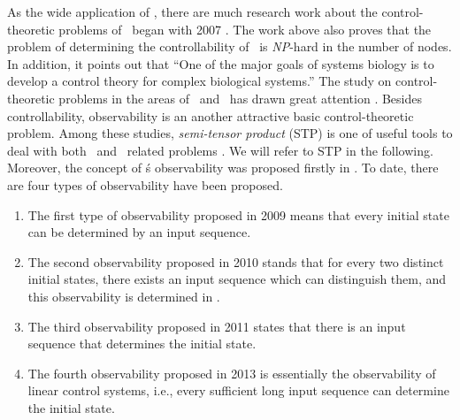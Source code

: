 As the wide application of \BCNs, there are much research work about the control-theoretic problems of \BCNs\ began with 2007 \cite{Akutsu2007Control}. The work above also proves that the problem of determining the controllability of \BCNs\ is {\em NP}-hard in the number of nodes. In addition, it points out that ``One of the major goals of systems biology is to develop a control theory for complex biological systems.'' The study on control-theoretic problems in the areas of \BNs\ and \BCNs\ has drawn great attention \cite{cheng2009controllability, Zhao2010Input, Cheng2011Identification, Cheng2011Analysis,Fornasini2013Observability}. Besides controllability, observability is an another  attractive basic control-theoretic problem.  Among these studies, \emph{semi-tensor product} (STP) is one of useful tools to deal with  both \BNs\ and \BCNs\  related problems \cite{cheng2009controllability}.  We will refer to STP in the following. Moreover,  the concept of \BCN\'s observability was proposed firstly in \cite{cheng2009controllability}. To date, there are four types of observability have been proposed. 
\begin{enumerate}
	\item The first type of observability proposed in 2009 \cite{cheng2009controllability} means that every initial state can be determined by an input sequence.
	
	\item 
	The second observability proposed in 2010 \cite{Zhao2010Input} stands that for every two distinct initial states, there exists an input sequence which can distinguish them, and this observability is determined in \cite{Li2015Controllability}.
	
	\item The third observability proposed in 2011 \cite{Cheng2011Identification} states that there is an input sequence that determines the initial state.
	
	\item  The fourth observability proposed in 2013 \cite{Fornasini2013Observability} is essentially the observability of linear control systems, i.e., every sufficient long input sequence can determine the initial state.
\end{enumerate}
 


